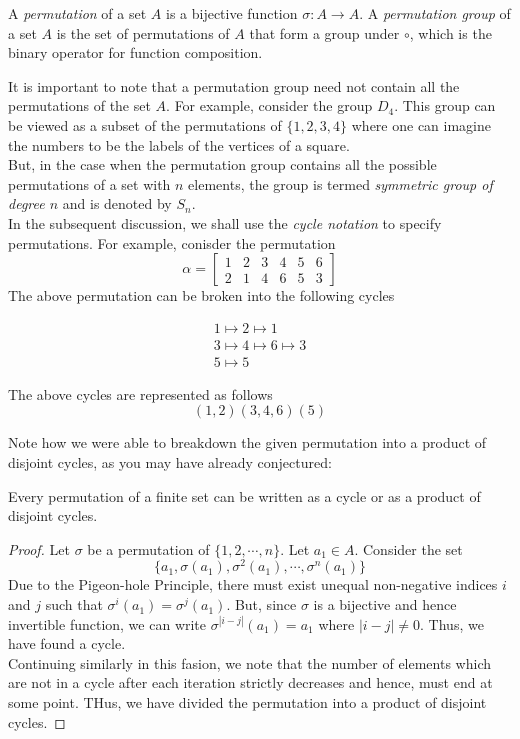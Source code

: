 \begin{definition}
	A \textit{permutation} of a set $A$ is a bijective function $\sigma:A\to A$. A \textit{permutation group} of a set $A$ is the set of permutations of $A$ that form a group under $\circ$, which is the binary operator for function composition.
\end{definition}

It is important to note that a permutation group need not contain all the permutations of the set $A$. For example, consider the group $D_4$. This group can be viewed as a subset of the permutations of $\{1,2,3,4\}$ where one can imagine the numbers to be the labels of the vertices of a square.\\
But, in the case when the permutation group contains all the possible permutations of a set with $n$ elements, the group is termed \textit{symmetric group of degree $n$} and is denoted by $S_n$.\\

In the subsequent discussion, we shall use the \textit{cycle notation} to specify permutations. For example, conisder the permutation 
$$
\alpha =
\begin{bmatrix}
	1 & 2 & 3 & 4 & 5 & 6\\
	2 & 1 & 4 & 6 & 5 & 3
\end{bmatrix}
$$
The above permutation can be broken into the following cycles

\begin{align*}
	1\mapsto2\mapsto1\\
	3\mapsto4\mapsto6\mapsto3\\
	5\mapsto5		
\end{align*}

The above cycles are represented as follows 
\begin{equation*}
	(1,2)(3,4,6)(5)
\end{equation*}

Note how we were able to breakdown the given permutation into a product of disjoint cycles, as you may have already conjectured:
\begin{proposition}
	Every permutation of a finite set can be written as a cycle or as a product of disjoint cycles.
\end{proposition}
\begin{proof}
	Let $\sigma$ be a permutation of $\{1,2,\cdots,n\}$. Let $a_1\in A$. Consider the set 
	$$
	\{a_1,\sigma(a_1),\sigma^2(a_1),\cdots,\sigma^n(a_1)\}
	$$
	Due to the Pigeon-hole Principle, there must exist unequal non-negative indices $i$ and $j$ such that $\sigma^i(a_1)=\sigma^j(a_1)$. But, since $\sigma$ is a bijective and hence invertible function, we can write $\sigma^{|i-j|}(a_1)=a_1$ where $|i-j|\ne0$. Thus, we have found a cycle.\\
	Continuing similarly in this fasion, we note that the number of elements which are not in a cycle after each iteration strictly decreases and hence, must end at some point. THus, we have divided the permutation into a product of disjoint cycles.
\end{proof}

